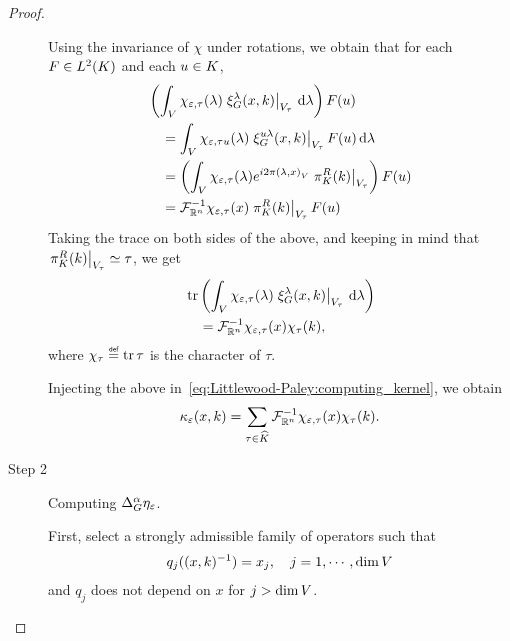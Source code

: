 \begin{proof}
\begin{description}
            Using the invariance of $\chi$ under rotations,
            we obtain that
            for each $F \in \Lebesgue 2 \CompactGroup$ and each $u \in \CompactGroup$,
            \begin{align*}
                &\left(\int_\VectorSpace \chi_{\epsilon, \tau} (\lambda) \eval {\Rep \lambda(x, k)} {V_\tau} \dd \lambda\right) F(u)\\
                &\quad = \int_\VectorSpace \chi_{\epsilon, \tau u} (\lambda) \eval {\Rep {u \lambda}(x, k)} {V_\tau} F(u) \dd \lambda\\
                &\quad = \left(\int_\VectorSpace \chi_{\epsilon, \tau} (\lambda) \e^{\i \turn \ip \lambda x} \eval {\RightRegularRepresentation(k)} {V_\tau}\right) F(u)\\
                &\quad = \InverseFourier [\R^n] \chi_{\epsilon, \tau}(x) \eval {\RightRegularRepresentation(k)} {V_\tau} F(u)
            \end{align*}
            Taking the trace on both sides of the above,
            and keeping in mind that $\eval {\RightRegularRepresentation(k)} {V_\tau} \simeq \tau$,
            we get
            \begin{align*}
                &\tr \left(\int_\VectorSpace \chi_{\epsilon, \tau} (\lambda) \eval {\Rep \lambda(x, k)} {V_\tau} \dd \lambda\right)\\
                &\quad = \InverseFourier [\R^n] \chi_{\epsilon, \tau}(x) \chi_\tau(k),
            \end{align*}
            where $\chi_\tau \defeq \tr \tau$ is the character of $\tau$.

            Injecting the above in~\eqref{eq:Littlewood-Paley:computing_kernel},
            we obtain
            \begin{align}
                \kappa_\epsilon(x, k)
                = \sum_{\tau \in \dualGroup \CompactGroup}
                \InverseFourier [\R^n] \chi_{\epsilon, \tau}(x) \chi_\tau(k).
                \label{eq:Littlewood-Paley:kernel}
            \end{align}
        \item [Step 2] Computing $\DifferenceOperatorOrder \alpha \eta_\epsilon$.

            First, select a strongly admissible family of operators such that
            \begin{align*}
                q_j((x, k)^{-1}) = x_j, \quad j = 1, \cdots, \dim \VectorSpace
            \end{align*}
            and $q_j$ does not depend on $x$ for $j > \dim \VectorSpace$.


\end{description}
\end{proof}
